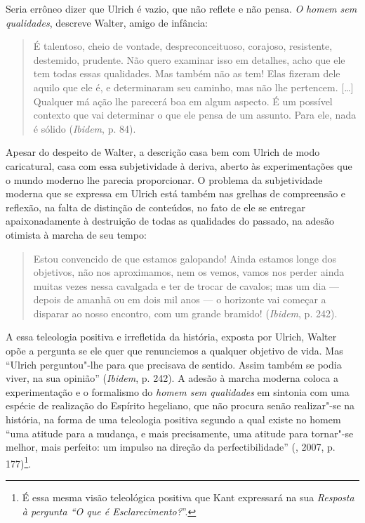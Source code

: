 Seria errôneo dizer que Ulrich é vazio, que não reflete e não pensa.
\emph{O} \emph{homem sem qualidades}, descreve Walter, amigo de
infância:

\begin{quote}
É talentoso, cheio de vontade, despreconceituoso, corajoso, resistente,
destemido, prudente. Não quero examinar isso em detalhes, acho que ele
tem todas essas qualidades. Mas também não as tem! Elas fizeram dele
aquilo que ele é, e determinaram seu caminho, mas não lhe pertencem.
[\ldots{}] Qualquer má ação lhe parecerá boa em algum aspecto. É um
possível contexto que vai determinar o que ele pensa de um assunto. Para
ele, nada é sólido (\emph{Ibidem}, p. 84).
\end{quote}

Apesar do despeito de Walter, a descrição casa bem com Ulrich de modo
caricatural, casa com essa subjetividade à deriva, aberto às
experimentações que o mundo moderno lhe parecia proporcionar. O problema
da subjetividade moderna que se expressa em Ulrich está também nas
grelhas de compreensão e reflexão, na falta de distinção de conteúdos,
no fato de ele se entregar apaixonadamente à destruição de todas as
qualidades do passado, na adesão otimista à marcha de seu tempo:

\begin{quote}
Estou convencido de que estamos galopando! Ainda estamos longe dos
objetivos, não nos aproximamos, nem os vemos, vamos nos perder ainda
muitas vezes nessa cavalgada e ter de trocar de cavalos; mas um dia ---
depois de amanhã ou em dois mil anos --- o horizonte vai começar a
disparar ao nosso encontro, com um grande bramido! (\emph{Ibidem}, p. 242).
\end{quote}

A essa teleologia positiva e irrefletida da história, exposta por
Ulrich, Walter opõe a pergunta se ele quer que renunciemos a qualquer
objetivo de vida. Mas ``Ulrich perguntou"-lhe para que precisava de
sentido. Assim também se podia viver, na sua opinião'' (\emph{Ibidem},
p. 242). A adesão à marcha moderna coloca a experimentação e o
formalismo do \emph{homem sem qualidades} em sintonia com uma espécie de
realização do Espírito hegeliano, que não procura senão realizar"-se na
história, na forma de uma teleologia positiva segundo a qual existe no
homem ``uma atitude para a mudança, e mais precisamente, uma atitude
para tornar"-se melhor, mais perfeito: um impulso na direção da
perfectibilidade'' (, 2007, p. 177)\footnote{É
  essa mesma visão teleológica positiva que Kant expressará na sua
  \emph{Resposta à pergunta ``O que é Esclarecimento?}''.}.

